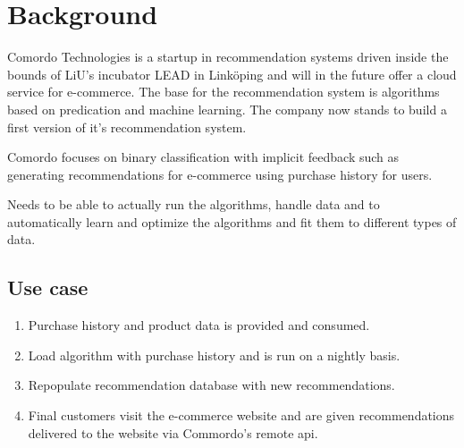 
\chapter{Background}\label{cha:background}

Comordo Technologies is a startup in recommendation systems driven inside the bounds of LiU's incubator LEAD in Linköping and will in the future offer a cloud service for e-commerce. The base for the recommendation system is algorithms based on predication and machine learning. The company now stands to build a first version of it's recommendation system.

Comordo focuses on binary classification with implicit feedback such as generating recommendations for e-commerce using purchase history for users.


Needs to be able to actually run the algorithms, handle data and to automatically learn and optimize the algorithms and fit them to different types of data.



\section{Use case}\label{sec:use}

\begin{enumerate}
    \item Purchase history and product data is provided and consumed.
    \item Load algorithm with purchase history and is run on a nightly basis.
    \item Repopulate recommendation database with new recommendations.
    \item Final customers visit the e-commerce website and are given recommendations delivered to the website via Commordo's remote api.
\end{enumerate}

